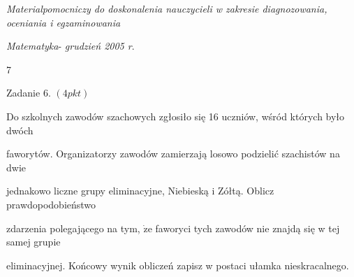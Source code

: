 \documentclass[a4paper,12pt]{article}
\begin{document}
{\it Materialpomocniczy do doskonalenia nauczycieli w zakresie diagnozowania, oceniania i egzaminowania}

{\it Matematyka}- {\it grudzień 2005 r}.

7

Zadanie 6. $(4pkt)$

Do szkolnych zawodów szachowych zgłosiło się 16 uczniów, wśród których było dwóch

faworytów. Organizatorzy zawodów zamierzają losowo podzielić szachistów na dwie

jednakowo liczne grupy eliminacyjne, Niebieską i Zółtą. Oblicz prawdopodobieństwo

zdarzenia polegającego na tym, $\dot{\mathrm{z}}\mathrm{e}$ faworyci tych zawodów nie znajdą się w tej samej grupie

eliminacyjnej. Końcowy wynik obliczeń zapisz w postaci ułamka nieskracalnego.
\end{document}
